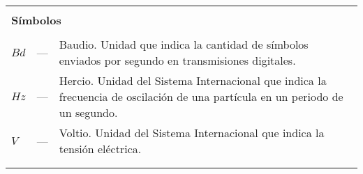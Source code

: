 \begin{longtable}{lcp{} }
\\
\\

\multicolumn{3}{l}{\textbf{Símbolos}}\\
\\
$Bd$ & --- & Baudio. Unidad que indica la cantidad de símbolos enviados por segundo en transmisiones digitales.\\

$Hz$ & --- & Hercio. Unidad del Sistema Internacional que indica la frecuencia de oscilación de una partícula en un periodo de un segundo.\\

$V$ & --- & Voltio. Unidad del Sistema Internacional que indica la tensión eléctrica.\\

\\
\\

\end{longtable}